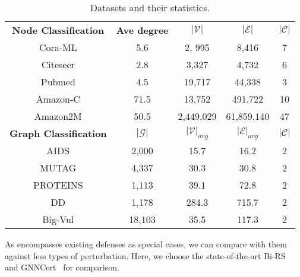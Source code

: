 \begin{table}[!t]
\vspace{+2mm}
    \footnotesize
    \centering 
    \addtolength{\tabcolsep}{-2pt}
    \renewcommand\arraystretch{0.9}
    \begin{tabular}{c|c|c|c|c}
     \toprule
          {\bf Node Classification}&{\bf Ave degree}&{$|\mathcal{V}|$}&$|\mathcal{E}|$&$|\mathcal{C}|$ \\
         \Xhline{0.9pt}
       Cora-ML&5.6&2, 995&8,416&7\\
         \cline{1-5} 
         Citeseer&2.8&3,327&4,732&6\\
         \cline{1-5} 
         Pubmed&4.5&19,717&44,338&3\\
         \cline{1-5} 
         Amazon-C&71.5&13,752&491,722&10\\
         \cline{1-5} 
        {Amazon2M}&50.5&2,449,029&61,859,140&47 \\
         \Xhline{1.2pt} 
       {\bf Graph Classification}&$|\mathcal{G}|$&$|\mathcal{V}|_{avg}$&$|\mathcal{E}|_{avg}$&$|\mathcal{C}|$ \\
         \Xhline{0.9pt}
         {AIDS}&2,000&15.7&16.2&2\\
         \cline{1-5} 
        MUTAG&4,337&30.3&30.8&2\\
         \cline{1-5} 
         PROTEINS&1,113&39.1&72.8&2\\
         \cline{1-5} 
        DD&1,178&284.3&715.7&2\\
         \cline{1-5} 
        {Big-Vul} &18,103 &35.5&117.3&2 \\
       \bottomrule
    \end{tabular}
    \caption{Datasets and their statistics.}
    \label{tab:datasets}
    \vspace{-2mm}
\end{table}


\vspace{+0.05in}
As  {\name} encompasses existing defenses as special cases, we can compare {\name} with them against less types of perturbation. 
Here, we choose the state-of-the-art Bi-RS~\cite{lai2023nodeawarebismoothingcertifiedrobustness} 
and GNNCert~\cite{xia2024gnncert} for comparison. 



